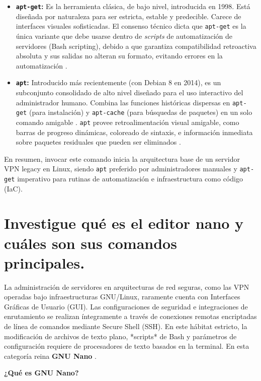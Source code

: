 \documentclass[a4paper,12pt]{article}
\begin{document}
\begin{itemize}
    \item \textbf{\texttt{apt-get}:} Es la herramienta clásica, de bajo nivel, introducida en 1998. Está diseñada por naturaleza para ser estricta, estable y predecible. Carece de interfaces visuales sofisticadas. El consenso técnico dicta que \texttt{apt-get} es la única variante que debe usarse dentro de \textit{scripts} de automatización de servidores (Bash scripting), debido a que garantiza compatibilidad retroactiva absoluta y sus salidas no alteran su formato, evitando errores en la automatización \cite{aws_apt, askubuntu_apt}.
    \item \textbf{\texttt{apt}:} Introducido más recientemente (con Debian 8 en 2014), es un subconjunto consolidado de alto nivel diseñado para el uso interactivo del administrador humano. Combina las funciones históricas dispersas en \texttt{apt-get} (para instalación) y \texttt{apt-cache} (para búsquedas de paquetes) en un solo comando amigable \cite{aws_apt}. \texttt{apt} provee retroalimentación visual amigable, como barras de progreso dinámicas, coloreado de sintaxis, e información inmediata sobre paquetes residuales que pueden ser eliminados \cite{aws_apt}.
\end{itemize}

En resumen, invocar este comando inicia la arquitectura base de un servidor VPN legacy en Linux, siendo \texttt{apt} preferido por administradores manuales y \texttt{apt-get} imperativo para rutinas de automatización e infraestructura como código (IaC).


\newpage
\section{Investigue qué es el editor nano y cuáles son sus comandos principales.}

La administración de servidores en arquitecturas de red seguras, como las VPN operadas bajo infraestructuras GNU/Linux, raramente cuenta con Interfaces Gráficas de Usuario (GUI). Las configuraciones de seguridad e integraciones de enrutamiento se realizan íntegramente a través de conexiones remotas encriptadas de línea de comandos mediante Secure Shell (SSH). En este hábitat estricto, la modificación de archivos de texto plano, *scripts* de Bash y parámetros de configuración requiere de procesadores de texto basados en la terminal. En esta categoría reina \textbf{GNU Nano} \cite{arsys_nano, librebyte_nano}.

\textbf{¿Qué es GNU Nano?}
\end{document}
